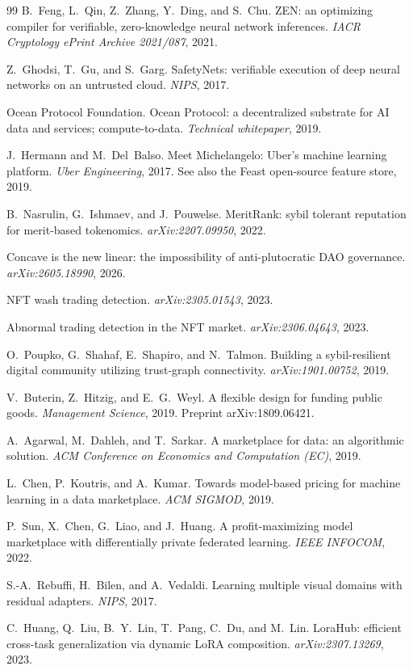 \documentclass[11pt]{article}
\begin{document}
\begin{thebibliography}{99}
    B.~Feng, L.~Qin, Z.~Zhang, Y.~Ding, and S.~Chu.
    ZEN: an optimizing compiler for verifiable, zero-knowledge neural
    network inferences.
    \emph{IACR Cryptology ePrint Archive 2021/087}, 2021.

    Z.~Ghodsi, T.~Gu, and S.~Garg.
    SafetyNets: verifiable execution of deep neural networks on an
    untrusted cloud.
    \emph{NIPS}, 2017.

    Ocean Protocol Foundation.
    Ocean Protocol: a decentralized substrate for AI data and
    services; compute-to-data.
    \emph{Technical whitepaper}, 2019.

    J.~Hermann and M.~Del~Balso.
    Meet Michelangelo: Uber's machine learning platform.
    \emph{Uber Engineering}, 2017. See also the Feast open-source
    feature store, 2019.

    B.~Nasrulin, G.~Ishmaev, and J.~Pouwelse.
    MeritRank: sybil tolerant reputation for merit-based tokenomics.
    \emph{arXiv:2207.09950}, 2022.

    Concave is the new linear: the impossibility of anti-plutocratic
    DAO governance.
    \emph{arXiv:2605.18990}, 2026.

    NFT wash trading detection.
    \emph{arXiv:2305.01543}, 2023.

    Abnormal trading detection in the NFT market.
    \emph{arXiv:2306.04643}, 2023.

    O.~Poupko, G.~Shahaf, E.~Shapiro, and N.~Talmon.
    Building a sybil-resilient digital community utilizing trust-graph
    connectivity.
    \emph{arXiv:1901.00752}, 2019.

    V.~Buterin, Z.~Hitzig, and E.~G.~Weyl.
    A flexible design for funding public goods.
    \emph{Management Science}, 2019. Preprint arXiv:1809.06421.

    A.~Agarwal, M.~Dahleh, and T.~Sarkar.
    A marketplace for data: an algorithmic solution.
    \emph{ACM Conference on Economics and Computation (EC)}, 2019.

    L.~Chen, P.~Koutris, and A.~Kumar.
    Towards model-based pricing for machine learning in a data
    marketplace.
    \emph{ACM SIGMOD}, 2019.

    P.~Sun, X.~Chen, G.~Liao, and J.~Huang.
    A profit-maximizing model marketplace with differentially private
    federated learning.
    \emph{IEEE INFOCOM}, 2022.

    S.-A.~Rebuffi, H.~Bilen, and A.~Vedaldi.
    Learning multiple visual domains with residual adapters.
    \emph{NIPS}, 2017.

    C.~Huang, Q.~Liu, B.~Y.~Lin, T.~Pang, C.~Du, and M.~Lin.
    LoraHub: efficient cross-task generalization via dynamic LoRA
    composition.
    \emph{arXiv:2307.13269}, 2023.

\end{thebibliography}
\end{document}

